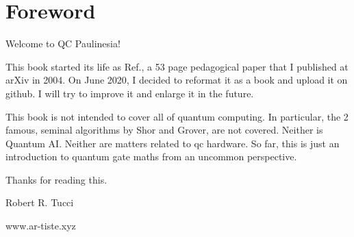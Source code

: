 \section{Foreword}
Welcome to QC Paulinesia!

This book started its life as Ref.\cite{origin}, a 53 page pedagogical paper that I published at arXiv in 2004. On June 2020,
I decided to reformat it as a book and 
upload it on github. I will
try to improve it and enlarge it 
in the future.

This book is not 
intended to
cover all of quantum computing. In particular, the 2 famous, seminal algorithms by Shor and Grover, are not covered. Neither is Quantum AI.
Neither are matters related to qc hardware. 
So far, this is just an introduction
to quantum gate
maths from an uncommon perspective.
 

\bigskip
\noindent Thanks for reading this.

\noindent Robert R. Tucci

\noindent www.ar-tiste.xyz